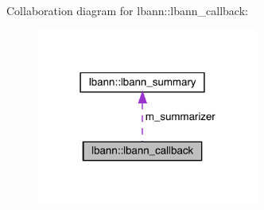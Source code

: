 Collaboration diagram for lbann\+:\+:lbann\+\_\+callback\+:\nopagebreak
\begin{figure}[H]
\begin{center}
\leavevmode
\includegraphics[width=207pt]{classlbann_1_1lbann__callback__coll__graph}
\end{center}
\end{figure}
